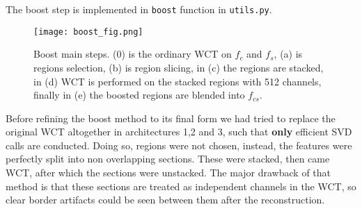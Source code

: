 The boost step is implemented in \texttt{boost} function in \texttt{utils.py}.\\

\begin{figure}[h!]
	\centering
	\texttt{[image: boost\_fig.png]}
	\caption{Boost main steps. (0) is the ordinary WCT on $f_c$ and $f_s$, (a) is regions selection, (b) is region slicing, in (c) the regions are stacked, in (d) WCT is performed on the stacked regions with 512 channels, finally in (e) the boosted regions are blended into $f_{cs}$.}
	\label{fig:boost}
\end{figure}

Before refining the boost method to its final form we had tried to replace the original WCT altogether in architectures 1,2 and 3, such that \textbf{only} efficient SVD calls are conducted. Doing so, regions were not chosen, instead, the features were perfectly split into non overlapping sections. These were stacked, then came WCT, after which the sections were unstacked. The major drawback of that method is that these sections are treated as independent channels in the WCT, so clear border artifacts could be seen between them after the reconstruction. 

